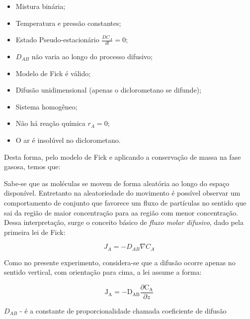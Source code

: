 \begin{itemize}

\item Mistura binária;
\item Temperatura e pressão constantes;
\item Estado Pseudo-estacionário $\frac{DC_A}{dt}= 0$;
\item $D_{AB}$ não varia ao longo do processo difusivo;
\item Modelo de Fick é válido;
\item Difusão unidimensional (apenas o diclorometano se difunde);
\item Sistema homogêneo;
\item Não há reação química $r_A=0$;
\item O ar é insolúvel no diclorometano.

\end{itemize}

Desta forma, pelo modelo de Fick e aplicando a conservação de massa na fase gasosa, temos que:

Sabe-se que as moléculas se movem de forma aleatória ao longo do espaço disponível. Entretanto na aleatoriedade do movimento é possível observar um comportamento de conjunto que favorece um fluxo de partículas no sentido que sai da região de maior concentração para aa região com menor concentração. Dessa interpretação, surge o conceito básico de \emph{fluxo molar difusivo}, dado pela primeira lei de Fick: 

\begin{equation}\label{key}
J_{A}=-D_{A B} \nabla C_{A}
\end{equation}

Como no presente experimento, considera-se que a difusão ocorre apenas no sentido vertical, com orientação para cima, a lei assume a forma:

\newpage


\begin{equation}\label{key}
\mathrm{J}_{\mathrm{A}}=-\mathrm{D}_{\mathrm{AB} } \dfrac{\partial \mathrm{C}_{\mathrm{A}}}{\partial z} 
\end{equation}


$D_{AB}$ - é a constante de proporcionalidade chamada coeficiente de difusão

